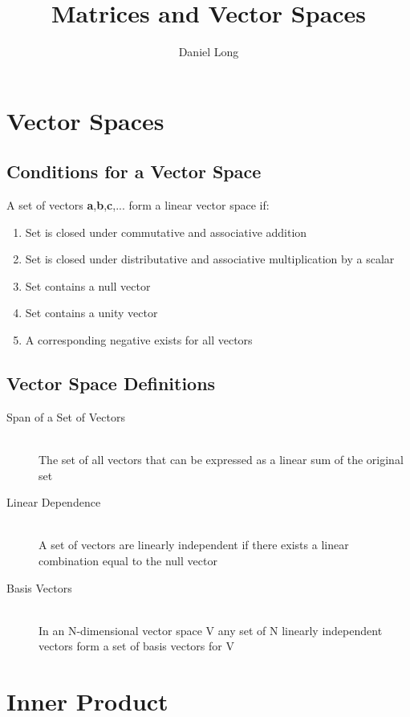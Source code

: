 \documentclass{article}
\title{Matrices and Vector Spaces}
\author{Daniel Long}
\begin{document}
\maketitle
  
\tableofcontents

\section{Vector Spaces}

\subsection{Conditions for a Vector Space}

A set of vectors \textbf{a},\textbf{b},\textbf{c},... form a linear vector space if:

\renewcommand{\theenumi}{\roman{enumi}}
\begin{enumerate}
\item Set is closed under commutative and associative addition
\item Set is closed under distributative and associative multiplication by a scalar
\item Set contains a null vector
\item Set contains a unity vector
\item A corresponding negative exists for all vectors
\end{enumerate}

\subsection{Vector Space Definitions}

\begin{description}
  \item[Span of a Set of Vectors] \hfill \\ The set of all vectors that can be expressed as a linear sum of the original set
  \item[Linear Dependence] \hfill \\ A set of vectors are linearly independent if there exists a linear combination equal to the null vector
  \item[Basis Vectors] \hfill \\ In an N-dimensional vector space V any set of N linearly independent vectors form a set of basis vectors for V
\end{description}

\section{Inner Product}
\end{document}
